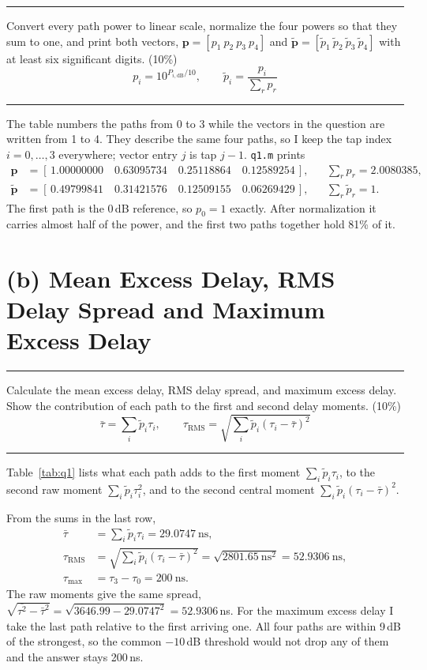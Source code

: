 \documentclass[12pt,a4paper]{report}
\newcommand{\question}[1]{%
    \hrule
    \vspace{0.2cm}
    #1
    \vspace{0.2cm}
    \hrule
    \vspace{0.5cm}
}
\begin{document}
\question{Convert every path power to linear scale, normalize the four powers so that they sum to one, and print both
vectors, $\mathbf{p} = [p_1\ p_2\ p_3\ p_4]$ and $\tilde{\mathbf{p}} = [\tilde p_1\ \tilde p_2\ \tilde p_3\ \tilde p_4]$
with at least six significant digits. (10\%)
\[ p_i = 10^{P_{i,\mathrm{dB}}/10}, \qquad \tilde p_i = \frac{p_i}{\sum_r p_r} \]}

The table numbers the paths from 0 to 3 while the vectors in the question are written from 1 to 4. They describe the
same four paths, so I keep the tap index $i = 0, \ldots, 3$ everywhere; vector entry $j$ is tap $j - 1$.
\texttt{q1.m} prints
\begin{align*}
    \mathbf{p} &= [\,1.00000000 \quad 0.63095734 \quad 0.25118864 \quad 0.12589254\,], && \textstyle\sum_r p_r = 2.0080385, \\
    \tilde{\mathbf{p}} &= [\,0.49799841 \quad 0.31421576 \quad 0.12509155 \quad 0.06269429\,], && \textstyle\sum_r \tilde p_r = 1 .
\end{align*}
The first path is the 0\,dB reference, so $p_0 = 1$ exactly. After normalization it carries almost half of the power,
and the first two paths together hold 81\% of it.

\section{(b) Mean Excess Delay, RMS Delay Spread and Maximum Excess Delay}

\question{Calculate the mean excess delay, RMS delay spread, and maximum excess delay. Show the contribution of each
path to the first and second delay moments. (10\%)
\[ \bar\tau = \sum_i \tilde p_i \tau_i, \qquad \tau_{\mathrm{RMS}} = \sqrt{\sum_i \tilde p_i (\tau_i - \bar\tau)^2} \]}

Table~\ref{tab:q1} lists what each path adds to the first moment $\sum_i \tilde p_i\tau_i$, to the second raw moment
$\sum_i \tilde p_i\tau_i^2$, and to the second central moment $\sum_i \tilde p_i(\tau_i - \bar\tau)^2$.

\begin{table}[H]
\centering
\caption{Power Delay Profile and the Contribution of Each Path to the Delay Moments}
\label{tab:q1}
\setlength{\tabcolsep}{6pt}
\renewcommand{\arraystretch}{1.2}

\end{table}

From the sums in the last row,
\begin{align}
    \bar\tau &= \sum_i \tilde p_i \tau_i = 29.0747\ \text{ns}, \\
    \tau_{\mathrm{RMS}} &= \sqrt{\sum_i \tilde p_i(\tau_i - \bar\tau)^2} = \sqrt{2801.65\ \text{ns}^2} = 52.9306\ \text{ns}, \\
    \tau_{\max} &= \tau_3 - \tau_0 = 200\ \text{ns}.
\end{align}
The raw moments give the same spread, $\sqrt{\overline{\tau^2} - \bar\tau^2} = \sqrt{3646.99 - 29.0747^2} =
52.9306$\,ns. For the maximum excess delay I take the last path relative to the first arriving one. All four paths are
within 9\,dB of the strongest, so the common $-10$\,dB threshold would not drop any of them and the answer stays 200\,ns.
\end{document}
